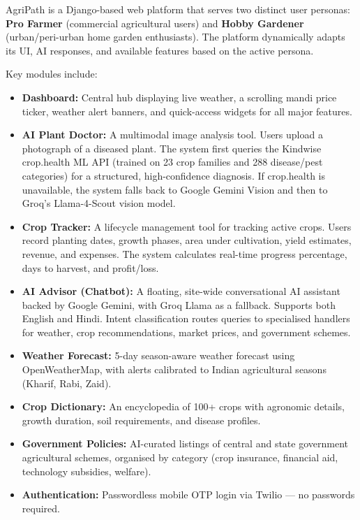 \documentclass[12pt,a4paper]{article}
\begin{document}
AgriPath is a Django-based web platform that serves two distinct user personas: \textbf{Pro Farmer} (commercial agricultural users) and \textbf{Hobby Gardener} (urban/peri-urban home garden enthusiasts). The platform dynamically adapts its UI, AI responses, and available features based on the active persona.

Key modules include:

\begin{itemize}
    \item \textbf{Dashboard:} Central hub displaying live weather, a scrolling mandi price ticker, weather alert banners, and quick-access widgets for all major features.
    \item \textbf{AI Plant Doctor:} A multimodal image analysis tool. Users upload a photograph of a diseased plant. The system first queries the Kindwise crop.health ML API (trained on 23 crop families and 288 disease/pest categories) for a structured, high-confidence diagnosis. If crop.health is unavailable, the system falls back to Google Gemini Vision and then to Groq's Llama-4-Scout vision model.
    \item \textbf{Crop Tracker:} A lifecycle management tool for tracking active crops. Users record planting dates, growth phases, area under cultivation, yield estimates, revenue, and expenses. The system calculates real-time progress percentage, days to harvest, and profit/loss.
    \item \textbf{AI Advisor (Chatbot):} A floating, site-wide conversational AI assistant backed by Google Gemini, with Groq Llama as a fallback. Supports both English and Hindi. Intent classification routes queries to specialised handlers for weather, crop recommendations, market prices, and government schemes.
    \item \textbf{Weather Forecast:} 5-day season-aware weather forecast using OpenWeatherMap, with alerts calibrated to Indian agricultural seasons (Kharif, Rabi, Zaid).
    \item \textbf{Crop Dictionary:} An encyclopedia of 100+ crops with agronomic details, growth duration, soil requirements, and disease profiles.
    \item \textbf{Government Policies:} AI-curated listings of central and state government agricultural schemes, organised by category (crop insurance, financial aid, technology subsidies, welfare).
    \item \textbf{Authentication:} Passwordless mobile OTP login via Twilio --- no passwords required.
\end{itemize}
\end{document}
